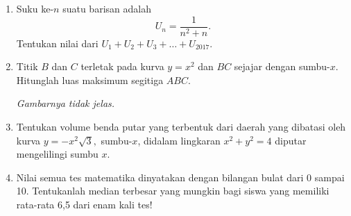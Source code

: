 \begin{enumerate}
\item Suku ke-$n$ suatu barisan adalah $$U_n = \frac{1}{n^2+n}.$$ Tentukan nilai dari $U_1 + U_2 + U_3 +\ldots + U_{2017}$.

\item Titik $B$ dan $C$ terletak pada kurva $y=x^2$ dan $BC$ sejajar dengan sumbu-$x$. Hitunglah luas maksimum segitiga $ABC$. \par \emph{Gambarnya tidak jelas.}

\item Tentukan volume benda putar yang terbentuk dari daerah yang dibatasi oleh kurva $y=-x^2\sqrt{3},$ sumbu-$x$, didalam lingkaran $x^2+y^2=4$ diputar mengelilingi sumbu $x$.

\item Nilai semua tes matematika dinyatakan dengan bilangan bulat dari 0 sampai 10. Tentukanlah median terbesar yang mungkin bagi siswa yang memiliki rata-rata 6,5 dari enam kali tes!

\end{enumerate}